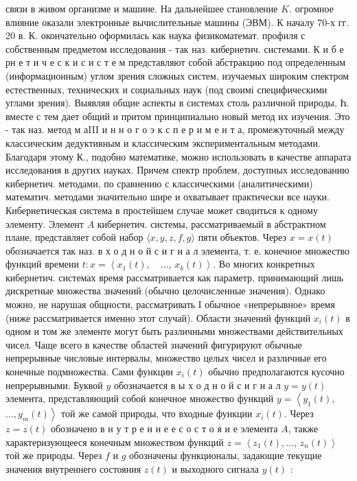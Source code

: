 \documentclass[10pt]{article}
\begin{document}
связи в живом организме и машине. На дальнейшее становление $K$. огромное влияние оказали электронные вычислительные машины (ЭВМ). К началу 70-х гг. 20 в. К. окончательно оформилась как наука физикоматемат. профиля с собственным предметом исследования - так наз. кибернетич. системами. К и б е рн е т и ч е с к и с и с т е м представляют собой абстракцию под определенным (информационным) углом зрения сложных систем, изучаемых широким спектром естественных, технических и социальных наук (под своимі специфическими углами зрения). Выявляя общие аспекты в системах столь различной природы, Һ. вместе с тем дает общий и притом принципиально новый метод их изучения. Это - так наз. метод м аIII и н н о г о э к с п е р и м е н т а, промежуточный между классическим дедуктивным и классическим экспериментальным методами. Благодаря этому К., подобно математике, можно использовать в качестве аппарата исследования в других науках. Причем спектр проблем, доступных исследованию кибернетич. методами, по сравнению с классическими (аналитическими) математич. методами значительно шире и охватывает практически все науки. Кибернетическая система в простейшем случае может сводиться к одному элементу. Элемент $A$ кибернетич. системы, рассматриваемый в абстрактном плане, представляет собой набор $\langle x, y, z, f, g\rangle$ пяти объектов. Через $x=x(t)$ обозначается так наз. в х о д н о й с и г н а л элемента, т. е. конечное множество функций времени $t: x=\left\langle x_{1}(t), \quad \ldots\right.$, $\left.x_{k}(t)\right\rangle$. Во многих конкретных кибернетич. системах время рассматривается как параметр, принимающий лишь дискретные множества значений (обычно целочисленные значения). Однако можно, не нарушая общности, рассматривать І обычное «непрерывное» время (ниже рассматривается именно этот случай). Области значений функций $x_{i}(t)$ в одном и том же элементе могут быть различными множествами действительных чисел. Чаще всего в качестве областей значений фигурируют обычные непрерывные числовые интервалы, множество целых чисел и различные его конечные подмножества. Сами функции $x_{i}(t)$ обычно предполагаются кусочно непрерывными. Буквой $y$ обозначается в ы х о д н о й с и г н а л $y=y(t)$ элемента, представляющий собой конечное множество функций $y=\left\langle y_{1}(t)\right.$, $\left.\ldots, y_{m}(t)\right\rangle$ той же самой природы, что входные функции $x_{i}(t)$. Через $z=z(t)$ обозначено в н у т р е н н е е с о с т о я и е элемента $A$, также характеризующееся конечным множеством функций $z=\left\langle z_{1}(t), \ldots\right.$, $\left.z_{n}(t)\right\rangle$ той же природы. Через $f$ и $g$ обозначены функционалы, задающие текущие значения внутреннего состояния $z(t)$ и выходного сигнала $y(t)$ :
\end{document}
